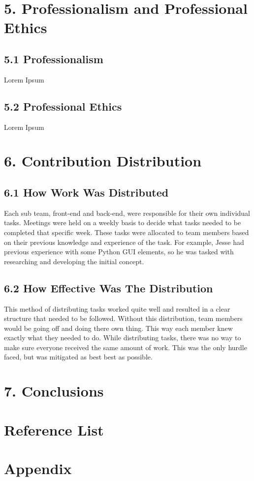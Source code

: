 \documentclass[11pt]{article}
\begin{document}

\section{5. Professionalism and Professional Ethics}

\subsection{5.1 Professionalism}
Lorem Ipsum

\subsection{5.2 Professional Ethics}
Lorem Ipsum



\section{6. Contribution Distribution}

\subsection{6.1 How Work Was Distributed}
Each sub team, front-end and back-end, were responsible for their own individual tasks. Meetings were held on a weekly basis to decide what tasks needed to be completed that specific week. These tasks were allocated to team members based on their previous knowledge and experience of the task. For example, Jesse had previous experience with some Python GUI elements, so he was tasked with researching and developing the initial concept.


\subsection{6.2 How Effective Was The Distribution}
This method of distributing tasks worked quite well and resulted in a clear structure that needed to be followed. Without this distribution, team members would be going off and doing there own thing. This way each member knew exactly what they needed to do. While distributing tasks, there was no way to make sure everyone received the same amount of work. This was the only hurdle faced, but was mitigated as best best as possible.





\section{7. Conclusions}




\section{Reference List}



\section{Appendix}
\end{document}
